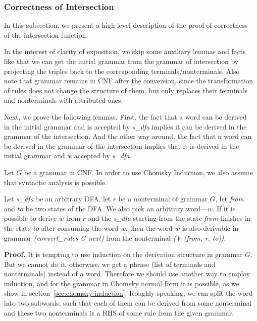 \subsubsection{Correctness of Intersection}
\label{sec:correctintersection}

In this subsection, we present a high-level description of the proof of correctness of the intersection function.

In the interest of clarity of exposition, we skip some auxiliary lemmas and facts like that we can get the initial grammar from the grammar of intersection by projecting the triples back to the corresponding terminals/nonterminals. Also note that grammar remains in CNF after the conversion, since the transformation of rules does not change the structure of them, but only replaces their terminals and nonterminals with attributed ones.

Next, we prove the following lemmas. First, the fact that a word can be derived in the initial grammar and is accepted by \textit{s\_dfa} implies it can be derived in the grammar of the intersection. And the other way around, the fact that a word can be derived in the grammar of the intersection implies that it is derived in the initial grammar and is accepted by \textit{s\_dfa}.

Let $G$ be a grammar in CNF. In order to use Chomsky Induction, we also assume that syntactic analysis is possible. 


\begin{theorem}
    Let \textit{s\_dfa} be an arbitrary DFA, let $r$ be a nonterminal of grammar $G$, let \textit{from} and $to$ be two states of the DFA. We also pick an arbitrary word---$w$. If it is possible to derive $w$ from $r$ and the \textit{s\_dfa} starting from the state \textit{from} finishes in the state \textit{to} after consuming the word $w$, then the word $w$ is also derivable in grammar \textit{(convert\_rules G next)} from the nonterminal \textit{(V (from, r, to))}.
\end{theorem}

\textbf{Proof.}
It is tempting to use induction on the derivation structure in grammar $G$. But we cannot do it, otherwise, we get a phrase (list of terminals and nonterminals) instead of a word. Therefore we should use another way to employ induction, and for the grammar in Chomsky normal form it is possible, as we show in section~\ref{sec:chomsky-induction}. Roughly speaking, we can split the word into two subwords, such that each of them can be derived from some nonterminal and these two nonterminals is a RHS of some rule from the given grammar.


